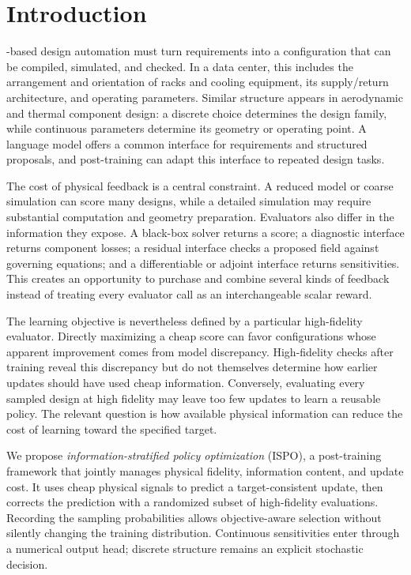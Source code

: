 \section{Introduction}
-based design automation must turn requirements into a configuration that can be compiled, simulated, and checked. In a data center, this includes the arrangement and orientation of racks and cooling equipment, its supply/return architecture, and operating parameters. Similar structure appears in aerodynamic and thermal component design: a discrete choice determines the design family, while continuous parameters determine its geometry or operating point. A language model offers a common interface for requirements and structured proposals, and post-training can adapt this interface to repeated design tasks.

The cost of physical feedback is a central constraint. A reduced model or coarse simulation can score many designs, while a detailed simulation may require substantial computation and geometry preparation. Evaluators also differ in the information they expose. A black-box solver returns a score; a diagnostic interface returns component losses; a residual interface checks a proposed field against governing equations; and a differentiable or adjoint interface returns sensitivities. This creates an opportunity to purchase and combine several kinds of feedback instead of treating every evaluator call as an interchangeable scalar reward.

The learning objective is nevertheless defined by a particular high-fidelity evaluator. Directly maximizing a cheap score can favor configurations whose apparent improvement comes from model discrepancy. High-fidelity checks after training reveal this discrepancy but do not themselves determine how earlier updates should have used cheap information. Conversely, evaluating every sampled design at high fidelity may leave too few updates to learn a reusable policy. The relevant question is how available physical information can reduce the cost of learning toward the specified target.

We propose \emph{information-stratified policy optimization} (ISPO), a post-training framework that jointly manages physical fidelity, information content, and update cost. It uses cheap physical signals to predict a target-consistent update, then corrects the prediction with a randomized subset of high-fidelity evaluations. Recording the sampling probabilities allows objective-aware selection without silently changing the training distribution. Continuous sensitivities enter through a numerical output head; discrete structure remains an explicit stochastic decision.

